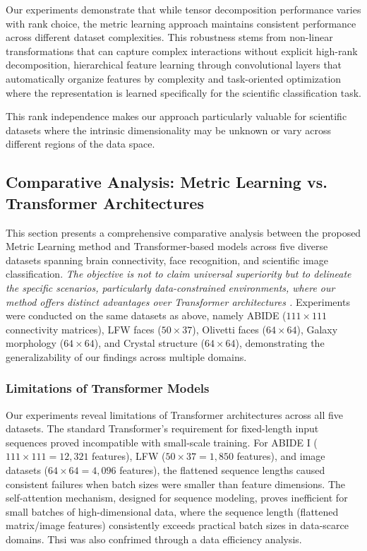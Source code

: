 \documentclass[a4paper,12pt,reqno]{amsart}
\theoremstyle{definition}
\theoremstyle{remark}
\begin{document}
Our experiments demonstrate that while tensor decomposition performance varies with rank choice, the metric learning approach maintains consistent performance across different dataset complexities. This robustness stems from non-linear transformations that can capture complex interactions without explicit high-rank decomposition, hierarchical feature learning through convolutional layers that automatically organize features by complexity and task-oriented optimization where the representation is learned specifically for the scientific classification task.

This rank independence makes our approach particularly valuable for scientific datasets where the intrinsic dimensionality may be unknown or vary across different regions of the data space.


\subsection{Comparative Analysis: Metric Learning vs. Transformer Architectures}
\label{sec:comparison}

This section presents a comprehensive comparative analysis between the proposed Metric Learning method and Transformer-based models across five diverse datasets spanning brain connectivity, face recognition, and scientific image classification. \textit{The objective is not to claim universal superiority but  to delineate the specific scenarios, particularly data-constrained environments, where our method offers distinct advantages over Transformer architectures \cite{vaswani2017attention}.} Experiments were conducted on the same datasets as above, namely ABIDE ($111 \times 111$ connectivity matrices), LFW faces ($50 \times 37$), Olivetti faces ($64 \times 64$), Galaxy morphology ($64 \times 64$), and Crystal structure ($64 \times 64$), demonstrating the generalizability of our findings across multiple domains.

\subsubsection{Limitations of Transformer Models}

Our experiments reveal limitations of Transformer architectures across all five datasets.
The standard Transformer's requirement for fixed-length input sequences proved incompatible with small-scale training. For ABIDE I ($111 \times 111 = 12,321$ features), LFW ($50 \times 37 = 1,850$ features), and image datasets ($64 \times 64 = 4,096$ features), the flattened sequence lengths caused consistent failures when batch sizes were smaller than feature dimensions.
 The self-attention mechanism, designed for sequence modeling, proves inefficient for small batches of high-dimensional data, where the sequence length (flattened matrix/image features) consistently exceeds practical batch sizes in data-scarce domains. Thsi was also confrimed through a data efficiency analysis.
\end{document}
